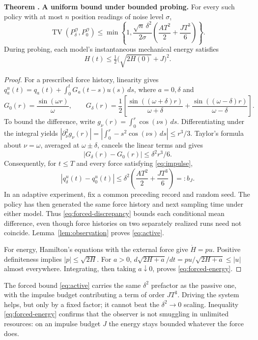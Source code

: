 \documentclass[10pt]{article}
\newcounter{claim}
\newcommand{\claim}[2]{\refstepcounter{claim}\label{#1}\textbf{#2 \theclaim.}}
\newcommand{\TV}{\operatorname{TV}}
\newcommand{\obs}{\mathcal O}
\begin{document}
\begin{resultbox}
\claim{thm:active}{Theorem} \textbf{A uniform bound under bounded probing.}
For every such policy with at most $n$ position readings of noise level $\sigma$,
\begin{equation}
\TV(P_\delta^{\obs},P_0^{\obs})
\leq\min\!\left\{1,
\frac{\sqrt n\,\delta^2}{2\sigma}
\left(\frac{AT^2}{2}+\frac{JT^3}{6}\right)\right\}.
\label{eq:active}
\end{equation}
During probing, each model's instantaneous mechanical energy satisfies
\begin{equation}
H(t)\leq\tfrac12\bigl(\sqrt{2H(0)}+J\bigr)^2.
\label{eq:forced-energy}
\end{equation}
\end{resultbox}
\begin{proof}
For a prescribed force history, linearity gives
$q_a^u(t)=q_a(t)+\int_0^tG_a(t-s)u(s)\,ds$, where $a=0,\delta$ and
\[
G_0(r)=\frac{\sin(\omega r)}{\omega},\qquad
G_\delta(r)=\frac12\left[
\frac{\sin((\omega+\delta)r)}{\omega+\delta}
+\frac{\sin((\omega-\delta)r)}{\omega-\delta}\right].
\]
To bound the difference, write $g_\nu(r)=\int_0^r\cos(\nu s)\,ds$.
Differentiating under the integral yields
$|\partial_\nu^2g_\nu(r)|
=|\int_0^r-s^2\cos(\nu s)\,ds|\leq r^3/3$.
Taylor's formula about $\nu=\omega$, averaged at $\omega\pm\delta$, cancels
the linear terms and gives
\[
|G_\delta(r)-G_0(r)|\leq\delta^2r^3/6.
\]
Consequently, for $t\leq T$ and every force satisfying \eqref{eq:impulse},
\begin{equation}
|q_\delta^u(t)-q_0^u(t)|
\leq\delta^2\left(\frac{AT^2}{2}+\frac{JT^3}{6}\right)=:b_J.
\label{eq:forced-discrepancy}
\end{equation}
In an adaptive experiment, fix a common preceding record and random seed.
The policy has then generated the same force history and next sampling time
under either model. Thus \eqref{eq:forced-discrepancy} bounds each conditional
mean difference, even though force histories on two separately realized runs
need not coincide. Lemma~\ref{lem:observation} proves \eqref{eq:active}.

For energy, Hamilton's equations with the external force give
$\dot H=pu$. Positive definiteness implies $|p|\leq\sqrt{2H}$.
For $a>0$, $d\sqrt{2H+a}/dt=pu/\sqrt{2H+a}\leq|u|$ almost everywhere.
Integrating, then taking $a\downarrow0$, proves \eqref{eq:forced-energy}.
\end{proof}

The forced bound \eqref{eq:active} carries the same $\delta^2$ prefactor as
the passive one, with the impulse budget contributing a term of order $JT^3$.
Driving the system helps, but only by a fixed factor; it cannot beat the
$\delta^2\to0$ scaling. Inequality \eqref{eq:forced-energy} confirms that the
observer is not smuggling in unlimited resources: on an impulse budget $J$ the
energy stays bounded whatever the force does.
\end{document}
